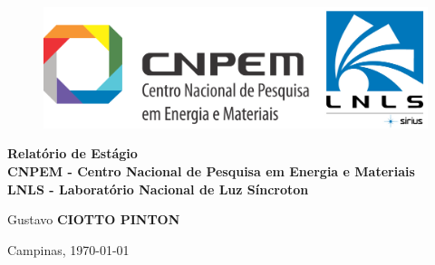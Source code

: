 \begin{titlepage}
\vspace*{.23\textheight}
\begin{center}
%
\begin{figure}[h]
    \centering
    \includegraphics[scale=0.14]{image/CNPEM_LNLS}
\end{figure} 

%
\vspace*{10pt}
\textbf{\LARGE Relatório de Estágio} \\ \vspace{12pt}
\textbf{CNPEM - Centro Nacional de Pesquisa em Energia e Materiais} \\ \vspace{12pt} 
\textbf{LNLS - Laboratório Nacional de Luz Síncroton} \\
\vspace*{72pt}

Gustavo \textbf{CIOTTO PINTON}
 
Campinas, \today

\end{center}
\end{titlepage}

\newpage